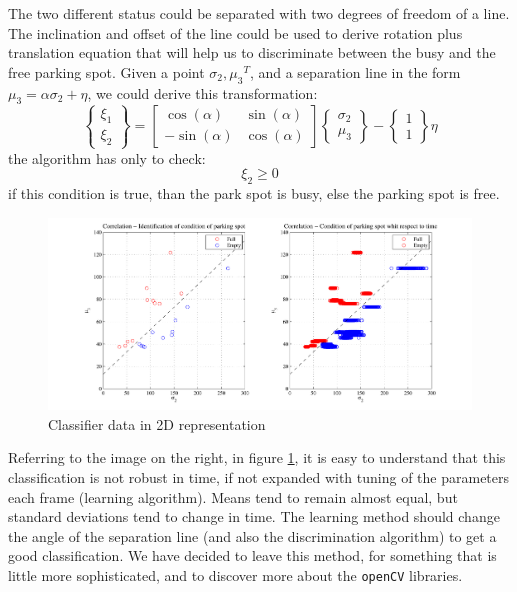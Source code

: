 	The two different status could be separated with two degrees of freedom of a
	line. The inclination and offset of the line could be used to derive
	rotation plus translation equation that will help us to discriminate between
	the busy and the free parking spot. Given a point ${\sigma_{2},\mu_{3}}^{T}$, and a
	separation line in the form $\mu_{3} = \alpha \sigma_{2}+\eta$, we could derive
	this transformation:
	\begin{equation}
		\left\{ \begin{array}{c}
\xi_{1}\\
\xi_{2}
\end{array}\right\} =\left[\begin{array}{cc}
\cos(\alpha) & \sin(\alpha)\\
-\sin(\alpha) & \cos(\alpha)
\end{array}\right]\left\{ \begin{array}{c}
\sigma_{2}\\
\mu_{3}
\end{array}\right\} -\left\{ \begin{array}{c}
1\\
1
\end{array}\right\} \eta
	\end{equation}
	the algorithm has only to check:
	\begin{equation}
		\xi_{2} \geq 0
	\end{equation}
	if this condition is true, than the park spot is busy, else the parking spot is
	free.
	\begin{figure}[H] \label{fig:separate}
		\centering
			\includegraphics[keepaspectratio, scale=0.4]{img/img1.pdf}
		\caption{Classifier data in 2D representation}
	\end{figure}
	
	Referring to the image on the right, in figure \ref{fig:separate}, it is easy
	to understand that this classification is not robust in time, if not
	expanded with tuning of the parameters each frame (learning
	algorithm). Means tend to remain almost equal, but standard deviations tend to
	change in time. The learning method should change the angle of the separation
	line (and also the discrimination algorithm) to get a good classification. We
	have decided to leave this method, for something that is little more 
	sophisticated, and to discover more about the \verb+openCV+ libraries.
	
